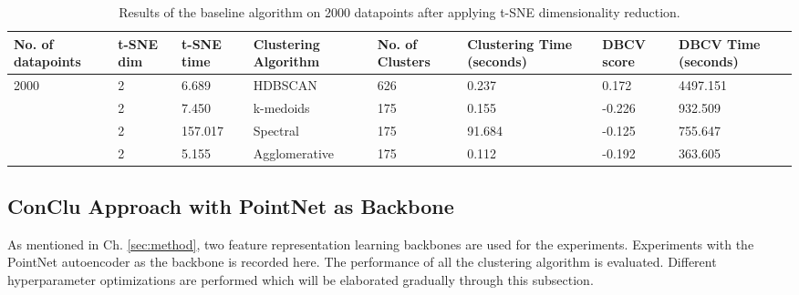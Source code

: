 \begin{table}[H]
    \setlength\extrarowheight{10pt}
    \caption{Results of the baseline algorithm on 2000 datapoints after applying \ac{t-SNE} dimensionality reduction. }
    \centering
    \begin{tabular}{|p{30pt}|p{30pt}|p{40pt}|p{60pt}|p{50pt}|p{40pt}|p{30pt}|p{40pt}|}
      \toprule
      No. of datapoints & \ac{t-SNE} dim	& \ac{t-SNE} time & Clustering Algorithm & No. of Clusters & Clustering Time (seconds) & \ac{DBCV} score & \ac{DBCV} Time (seconds)\\
      \midrule
      \multirow{4}{30pt}{2000} & 2	& 6.689 & \ac{HDBSCAN}	& 626	& 0.237 & 0.172	& 4497.151 \\ \cline{2-8} 
                                & 2	& 7.450 & k-medoids	& 175	& 0.155 & -0.226 &	932.509 \\ \cline{2-8} 
                                & 2	& 157.017& Spectral	& 175	& 91.684 & -0.125 & 755.647 \\ \cline{2-8}
                                & 2	&  5.155 & Agglomerative & 175 & 0.112 & -0.192 & 363.605 \\ 
      \bottomrule
    \end{tabular}
    \label{tab:basic_2000_with_tsne}
\end{table}

\subsection{ConClu Approach with PointNet as Backbone}
\label{sec:conclu_with_pointnet}
As mentioned in Ch. \ref{sec:method}, two feature representation learning backbones are used for the experiments. Experiments with the PointNet autoencoder as the backbone is recorded here. The performance of all the clustering algorithm is evaluated. Different hyperparameter optimizations are performed which will be elaborated  gradually through this subsection.  

